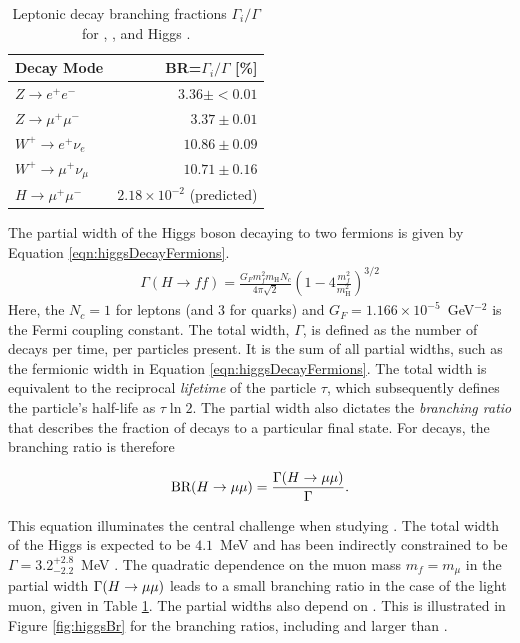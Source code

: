 \begin{table}[htp]
\caption{Leptonic decay branching fractions $\Gamma_i/\Gamma$ for \W, \Z, and Higgs \cite{pdg2018}.}
\begin{center}
\begin{tabular}{l r}
\toprule
Decay Mode & BR=$\Gamma_i/\Gamma$ [\%] \\
\midrule
$Z\to e^+e^-$           & $3.36\pm<0.01$ \\
$Z\to \mu^+\mu^-$       & $3.37\pm0.01 $ \\
$W^+\to   e^+\nu_e$     & $10.86\pm0.09$ \\
$W^+\to \mu^+\nu_\mu$   & $10.71\pm0.16$ \\
$H\to \mu^+\mu^-$       & $2.18\times10^{-2}$ (predicted) \\
\bottomrule
\end{tabular}
\label{tab:decayCrossSec}
\end{center}
\end{table}


The partial width of the Higgs boson decaying to two fermions is given by Equation \ref{eqn:higgsDecayFermions}.
\begin{equation}\begin{split}\label{eqn:higgsDecayFermions}
\Gamma(H\to ff)=\frac{G_Fm_f^2m_\text{H}N_c}{4\pi\sqrt{2}}\left(1-4\frac{m_f^2}{m_\text{H}^2}\right)^{3/2}
\end{split}\end{equation} 
Here, the $N_c=1$ for leptons (and 3 for quarks) and $G_F=1.166\times10^{-5}$~GeV$^{-2}$ is the Fermi coupling constant.
The total width, $\Gamma$, is defined as the number of decays per time, per particles present.
It is the sum of all partial widths, such as the fermionic width in Equation \ref{eqn:higgsDecayFermions}.
The total width is equivalent to the reciprocal \emph{lifetime} of the particle $\tau$, which subsequently defines the particle's half-life as $\tau\ln2$.
The partial width also dictates the \emph{branching ratio} that describes the fraction of decays to a particular final state.
For \hmm decays, the branching ratio is therefore

\begin{equation}\begin{split}
    \text{BR}(H\to\mu\mu)=\frac{\Gamma(H\to\mu\mu)}{\Gamma}.
\end{split}\end{equation} 

This equation illuminates the central challenge when studying \hmm. 
The total width of the Higgs is expected to be $4.1$~MeV and has been indirectly constrained to be $\Gamma=3.2^{+2.8}_{-2.2}$~MeV \cite{cmsWidth}.
The quadratic dependence on the muon mass $m_f=m_\mu$ in the partial width $\Gamma(H\to\mu\mu)$ leads to a small branching ratio in the case of the light muon, given in Table \ref{tab:decayCrossSec}.
The partial widths also depend on \mh. This is illustrated in Figure \ref{fig:higgsBr} for the branching ratios, including and larger than \hmm.

